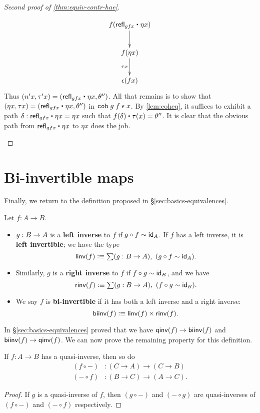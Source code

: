 \begin{proof}[Second proof of \autoref{thm:equiv-contr-hae}]
\begin{enumerate}
\begin{align*}
\xymatrix{
f(\refl{gfx} \ct \eta x) \ar[d] \\
f(\eta x) \ar[d] _{\tau x} \\
\epsilon (f x)}
\end{align*}
Thus $(n'x,\tau' x) = (\refl{gfx} \ct \eta x, \theta'')$. All that remains is to show that $(\eta x, \tau x) = (\refl{gfx} \ct \eta x, \theta'')$ in $\coh{g}{f}{\epsilon} \; x$. By \autoref{lem:coheq}, it suffices to exhibit a path $\delta : \refl{gfx} \ct \eta x = \eta x$ such that $f(\delta) \ct \tau(x) = \theta''$. It is clear that the obvious path from $\refl{gfx} \ct \eta x$ to $\eta x$ does the job. \qedhere
\end{enumerate}  
\end{proof}


\section{Bi-invertible maps}
\label{sec:biinv}

Finally, we return to the definition proposed in \S\ref{sec:basics-equivalences}.

\begin{defn}
  Let $f:A\to B$.
  \begin{itemize}
  \item $g:B\ra A$ is a \textbf{left inverse} to $f$ if $g\circ f\htpy \idfunc[A]$.
    If $f$ has a left inverse, it is \textbf{left invertible}; we have the type
    \[ \linv(f) \defeq \sm{g:B\to A} (g\circ f\htpy \idfunc[A]). \]
  \item Similarly, $g$ is a \textbf{right inverse} to $f$ if $f\circ g\htpy \idfunc[B]$, and we have
    \[ \rinv(f) \defeq \sm{g:B\to A} (f\circ g\htpy \idfunc[B]). \]
  \item We say $f$ is \textbf{bi-invertible} if it has both a left inverse and a right inverse:
    \[ \biinv (f) \defeq \linv(f) \times \rinv(f). \]
  \end{itemize}
\end{defn}

In \S\ref{sec:basics-equivalences} proved that we have $\qinv(f)\to\biinv(f)$ and $\biinv(f)\to\qinv(f)$.
We can now prove the remaining property for this definition.

\begin{lem}\label{thm:equiv-compose-equiv}
  If $f:A\to B$ has a quasi-inverse, then so do
  \begin{align*}
    (f\circ -) &: (C\to A) \to (C\to B)\\
    (-\circ f) &: (B\to C) \to (A\to C).
  \end{align*}
\end{lem}
\begin{proof}
  If $g$ is a quasi-inverse of $f$, then $(g\circ -)$ and $(-\circ g)$ are quasi-inverses of $(f\circ -)$ and $(-\circ f)$ respectively.
\end{proof}

